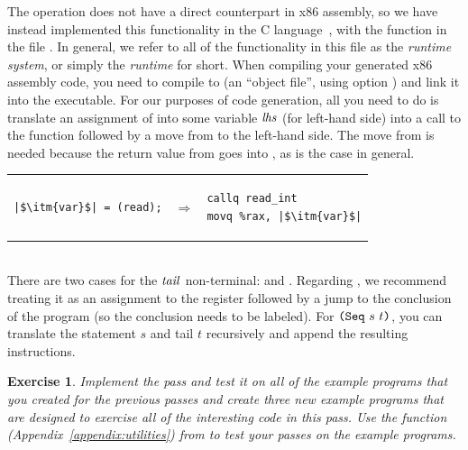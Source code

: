\documentclass[11pt]{book}
\newtheorem{exercise}[theorem]{Exercise}
\begin{document}
The  operation does not have a direct counterpart in x86
assembly, so we have instead implemented this functionality in the C
language~\citep{Kernighan:1988nx}, with the function 
in the file . In general, we refer to all of the
functionality in this file as the \emph{runtime system},
or simply the \emph{runtime} for short. When compiling your generated x86
assembly code, you need to compile  to  (an
``object file'', using  option ) and link it into
the executable. For our purposes of code generation, all you need to
do is translate an assignment of  into some variable
$\mathit{lhs}$ (for left-hand side) into a call to the 
function followed by a move from  to the left-hand side.
The move from  is needed because the return value from
 goes into , as is the case in general.  \\
\begin{tabular}{lll}
\begin{minipage}{0.3\textwidth}
\begin{lstlisting}
|$\itm{var}$| = (read);
\end{lstlisting}
\end{minipage}
&
$\Rightarrow$
&
\begin{minipage}{0.3\textwidth}
\begin{lstlisting}
callq read_int
movq %rax, |$\itm{var}$|
\end{lstlisting}
\end{minipage}
\end{tabular} \\

There are two cases for the $\mathit{tail}$ non-terminal:  and
. Regarding , we recommend treating it as an
assignment to the  register followed by a jump to the
conclusion of the program (so the conclusion needs to be labeled).
For $\texttt{(Seq}~s~t\texttt{)}$, you can translate the statement $s$ and tail $t$
recursively and append the resulting instructions.

\begin{exercise}
\normalfont
Implement the  pass and test it on all of the
example programs that you created for the previous passes and create
three new example programs that are designed to exercise all of the
interesting code in this pass. Use the  function
(Appendix~\ref{appendix:utilities}) from  to test
your passes on the example programs.
\end{exercise}
\end{document}
